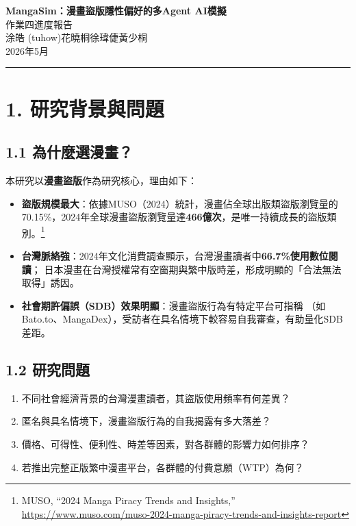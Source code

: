 \documentclass[12pt, a4paper]{article}
\begin{document}
\begin{center}
  {\LARGE\bfseries MangaSim：漫畫盜版隱性偏好的多Agent AI模擬}\\[0.4em]
  {\large 作業四進度報告}\\[0.6em]
  涂皓 (tuhow)\quad 花曉桐\quad 徐瑋倢\quad 黃少桐\\[0.3em]
  2026年5月
\end{center}

\vspace{0.5em}
\noindent\rule{\linewidth}{0.5pt}

\section{1. 研究背景與問題}

\subsection{1.1 為什麼選漫畫？}

本研究以\textbf{漫畫盜版}作為研究核心，理由如下：

\begin{itemize}
  \item \textbf{盜版規模最大}：依據MUSO（2024）統計，漫畫佔全球出版類盜版瀏覽量的
        70.15\%，2024年全球漫畫盜版瀏覽量達\textbf{466億次}，是唯一持續成長的盜版類別。\footnote{MUSO, ``2024 Manga Piracy Trends and Insights,'' \url{https://www.muso.com/muso-2024-manga-piracy-trends-and-insights-report}}

  \item \textbf{台灣脈絡強}：2024年文化消費調查顯示，台灣漫畫讀者中\textbf{66.7\%使用數位閱讀}；
        日本漫畫在台灣授權常有空窗期與繁中版時差，形成明顯的「合法無法取得」誘因。

  \item \textbf{社會期許偏誤（SDB）效果明顯}：漫畫盜版行為有特定平台可指稱
        （如Bato.to、MangaDex），受訪者在具名情境下較容易自我審查，有助量化SDB差距。
\end{itemize}

\subsection{1.2 研究問題}

\begin{enumerate}
  \item 不同社會經濟背景的台灣漫畫讀者，其盜版使用頻率有何差異？
  \item 匿名與具名情境下，漫畫盜版行為的自我揭露有多大落差？
  \item 價格、可得性、便利性、時差等因素，對各群體的影響力如何排序？
  \item 若推出完整正版繁中漫畫平台，各群體的付費意願（WTP）為何？
\end{enumerate}
\end{document}
